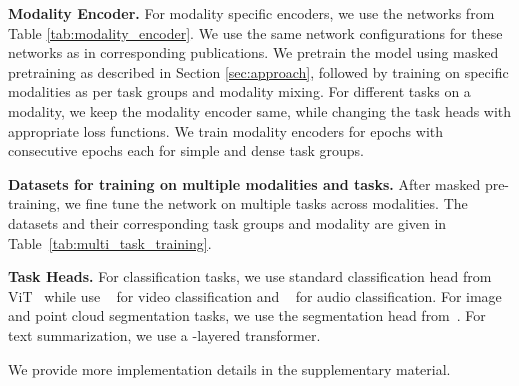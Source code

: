 \noindent\textbf{Modality Encoder.} For modality specific encoders, we use the networks from Table \ref{tab:modality_encoder}. We use the same network configurations for these networks as in corresponding publications. We pretrain the model using masked pretraining as described in Section \ref{sec:approach}, followed by training on specific modalities as per task groups and modality mixing. For different tasks on a modality, we keep the modality encoder same, while changing the task heads with appropriate loss functions. We train modality encoders for  epochs with  consecutive epochs each for simple and dense task groups.  

\noindent\textbf{Datasets for training on multiple modalities and tasks.} After masked pre-training, we fine tune the network on multiple tasks across modalities. 
The datasets and their corresponding task groups and modality are given in Table~\ref{tab:multi_task_training}.

\noindent\textbf{Task Heads.} For classification tasks, we use standard classification head from ViT~\cite{dosovitskiy2020image} while use ~\cite{arnab2021vivit} for video classification and ~\cite{gong2021ast} for audio classification.  For image and point cloud segmentation tasks, we use the segmentation head from~\cite{ranftl2021vision}. For text summarization, we use a -layered transformer.

We provide more implementation details in the supplementary material.


